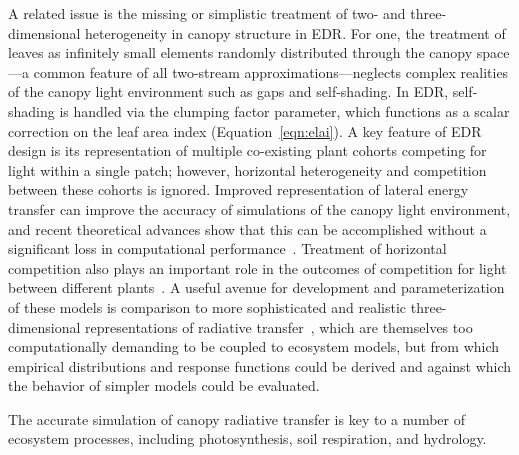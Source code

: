 A related issue is the missing or simplistic treatment of two- and three-dimensional heterogeneity in canopy structure in EDR.
For one, the treatment of leaves as infinitely small elements randomly distributed through the canopy space---a common feature of all two-stream approximations---neglects complex realities of the canopy light environment such as gaps and self-shading.
In EDR, self-shading is handled via the clumping factor parameter, which functions as a scalar correction on the leaf area index (Equation~\ref{eqn:elai}).
A key feature of EDR design is its representation of multiple co-existing plant cohorts competing for light within a single patch;
however, horizontal heterogeneity and competition between these cohorts is ignored.
Improved representation of lateral energy transfer can improve the accuracy of simulations of the canopy light environment, and recent theoretical advances show that this can be accomplished without a significant loss in computational performance~\citep{hogan_2018_fast}.
Treatment of horizontal competition also plays an important role in the outcomes of competition for light between different plants~\citep{fisher2018vegetation}.
A useful avenue for development and parameterization of these models is comparison to more sophisticated and realistic three-dimensional representations of radiative transfer~\citep[e.g.][]{widlowski2007third}, which are themselves too computationally demanding to be coupled to ecosystem models, but from which empirical distributions and response functions could be derived and against which the behavior of simpler models could be evaluated.

The accurate simulation of canopy radiative transfer is key to a number of ecosystem processes, including photosynthesis, soil respiration, and hydrology.


